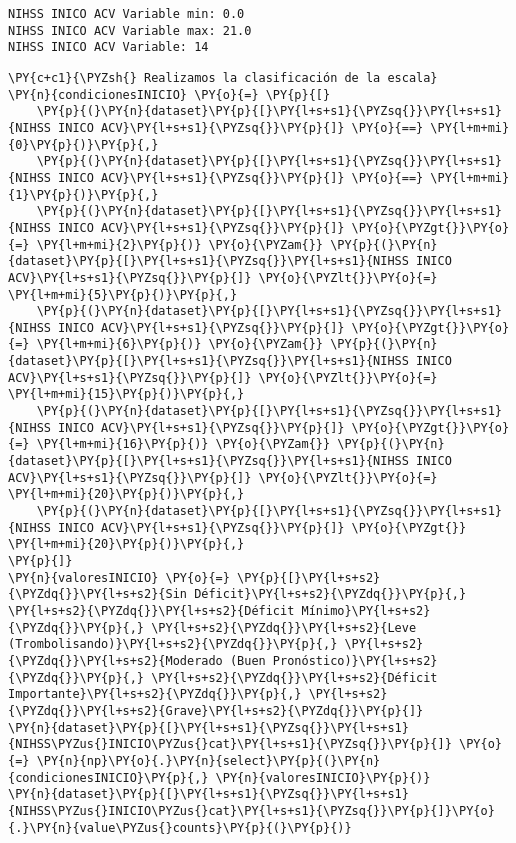     \begin{Verbatim}[commandchars=\\\{\}]
NIHSS INICO ACV Variable min: 0.0
NIHSS INICO ACV Variable max: 21.0
NIHSS INICO ACV Variable: 14
    \end{Verbatim}

    \begin{tcolorbox}[breakable, size=fbox, boxrule=1pt, pad at break*=1mm,colback=cellbackground, colframe=cellborder]
\begin{Verbatim}[commandchars=\\\{\}]
\PY{c+c1}{\PYZsh{} Realizamos la clasificación de la escala}
\PY{n}{condicionesINICIO} \PY{o}{=} \PY{p}{[}
    \PY{p}{(}\PY{n}{dataset}\PY{p}{[}\PY{l+s+s1}{\PYZsq{}}\PY{l+s+s1}{NIHSS INICO ACV}\PY{l+s+s1}{\PYZsq{}}\PY{p}{]} \PY{o}{==} \PY{l+m+mi}{0}\PY{p}{)}\PY{p}{,}
    \PY{p}{(}\PY{n}{dataset}\PY{p}{[}\PY{l+s+s1}{\PYZsq{}}\PY{l+s+s1}{NIHSS INICO ACV}\PY{l+s+s1}{\PYZsq{}}\PY{p}{]} \PY{o}{==} \PY{l+m+mi}{1}\PY{p}{)}\PY{p}{,}
    \PY{p}{(}\PY{n}{dataset}\PY{p}{[}\PY{l+s+s1}{\PYZsq{}}\PY{l+s+s1}{NIHSS INICO ACV}\PY{l+s+s1}{\PYZsq{}}\PY{p}{]} \PY{o}{\PYZgt{}}\PY{o}{=} \PY{l+m+mi}{2}\PY{p}{)} \PY{o}{\PYZam{}} \PY{p}{(}\PY{n}{dataset}\PY{p}{[}\PY{l+s+s1}{\PYZsq{}}\PY{l+s+s1}{NIHSS INICO ACV}\PY{l+s+s1}{\PYZsq{}}\PY{p}{]} \PY{o}{\PYZlt{}}\PY{o}{=} \PY{l+m+mi}{5}\PY{p}{)}\PY{p}{,}
    \PY{p}{(}\PY{n}{dataset}\PY{p}{[}\PY{l+s+s1}{\PYZsq{}}\PY{l+s+s1}{NIHSS INICO ACV}\PY{l+s+s1}{\PYZsq{}}\PY{p}{]} \PY{o}{\PYZgt{}}\PY{o}{=} \PY{l+m+mi}{6}\PY{p}{)} \PY{o}{\PYZam{}} \PY{p}{(}\PY{n}{dataset}\PY{p}{[}\PY{l+s+s1}{\PYZsq{}}\PY{l+s+s1}{NIHSS INICO ACV}\PY{l+s+s1}{\PYZsq{}}\PY{p}{]} \PY{o}{\PYZlt{}}\PY{o}{=} \PY{l+m+mi}{15}\PY{p}{)}\PY{p}{,}
    \PY{p}{(}\PY{n}{dataset}\PY{p}{[}\PY{l+s+s1}{\PYZsq{}}\PY{l+s+s1}{NIHSS INICO ACV}\PY{l+s+s1}{\PYZsq{}}\PY{p}{]} \PY{o}{\PYZgt{}}\PY{o}{=} \PY{l+m+mi}{16}\PY{p}{)} \PY{o}{\PYZam{}} \PY{p}{(}\PY{n}{dataset}\PY{p}{[}\PY{l+s+s1}{\PYZsq{}}\PY{l+s+s1}{NIHSS INICO ACV}\PY{l+s+s1}{\PYZsq{}}\PY{p}{]} \PY{o}{\PYZlt{}}\PY{o}{=} \PY{l+m+mi}{20}\PY{p}{)}\PY{p}{,}
    \PY{p}{(}\PY{n}{dataset}\PY{p}{[}\PY{l+s+s1}{\PYZsq{}}\PY{l+s+s1}{NIHSS INICO ACV}\PY{l+s+s1}{\PYZsq{}}\PY{p}{]} \PY{o}{\PYZgt{}} \PY{l+m+mi}{20}\PY{p}{)}\PY{p}{,}
\PY{p}{]}
\PY{n}{valoresINICIO} \PY{o}{=} \PY{p}{[}\PY{l+s+s2}{\PYZdq{}}\PY{l+s+s2}{Sin Déficit}\PY{l+s+s2}{\PYZdq{}}\PY{p}{,} \PY{l+s+s2}{\PYZdq{}}\PY{l+s+s2}{Déficit Mínimo}\PY{l+s+s2}{\PYZdq{}}\PY{p}{,} \PY{l+s+s2}{\PYZdq{}}\PY{l+s+s2}{Leve (Trombolisando)}\PY{l+s+s2}{\PYZdq{}}\PY{p}{,} \PY{l+s+s2}{\PYZdq{}}\PY{l+s+s2}{Moderado (Buen Pronóstico)}\PY{l+s+s2}{\PYZdq{}}\PY{p}{,} \PY{l+s+s2}{\PYZdq{}}\PY{l+s+s2}{Déficit Importante}\PY{l+s+s2}{\PYZdq{}}\PY{p}{,} \PY{l+s+s2}{\PYZdq{}}\PY{l+s+s2}{Grave}\PY{l+s+s2}{\PYZdq{}}\PY{p}{]}
\PY{n}{dataset}\PY{p}{[}\PY{l+s+s1}{\PYZsq{}}\PY{l+s+s1}{NIHSS\PYZus{}INICIO\PYZus{}cat}\PY{l+s+s1}{\PYZsq{}}\PY{p}{]} \PY{o}{=} \PY{n}{np}\PY{o}{.}\PY{n}{select}\PY{p}{(}\PY{n}{condicionesINICIO}\PY{p}{,} \PY{n}{valoresINICIO}\PY{p}{)}
\PY{n}{dataset}\PY{p}{[}\PY{l+s+s1}{\PYZsq{}}\PY{l+s+s1}{NIHSS\PYZus{}INICIO\PYZus{}cat}\PY{l+s+s1}{\PYZsq{}}\PY{p}{]}\PY{o}{.}\PY{n}{value\PYZus{}counts}\PY{p}{(}\PY{p}{)}
\end{Verbatim}
\end{tcolorbox}
